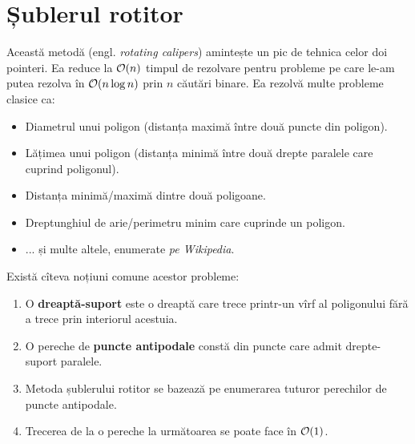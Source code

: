 \documentclass[../main.tex]{subfiles}
\begin{document}
\section{Șublerul rotitor}

Această metodă (engl. \textit{rotating calipers}) amintește un pic de tehnica celor doi pointeri. Ea reduce la $\mathcal{O}(n)$ timpul de rezolvare pentru probleme pe care le-am putea rezolva în $\mathcal{O}(n \log n)$ prin $n$ căutări binare. Ea rezolvă multe probleme clasice ca:

\begin{itemize}
  \item Diametrul unui poligon (distanța maximă între două puncte din poligon).
  \item Lățimea unui poligon (distanța minimă între două drepte paralele care cuprind poligonul).
  \item Distanța minimă/maximă dintre două poligoane.
  \item Dreptunghiul de arie/perimetru minim care cuprinde un poligon.
  \item ... și multe altele, enumerate \textit{pe Wikipedia}.
\end{itemize}

Există cîteva noțiuni comune acestor probleme:

\begin{enumerate}
  \item O \textbf{dreaptă-suport} este o dreaptă care trece printr-un vîrf al poligonului fără a trece prin interiorul acestuia.
  \item O pereche de \textbf{puncte antipodale} constă din puncte care admit drepte-suport paralele.
  \item Metoda șublerului rotitor se bazează pe enumerarea tuturor perechilor de puncte antipodale.
  \item Trecerea de la o pereche la următoarea se poate face în $\mathcal{O}(1)$.
\end{enumerate}
\end{document}
